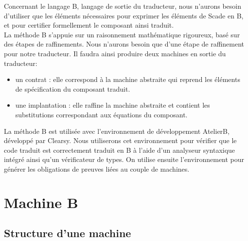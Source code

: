 

Concernant le langage B, langage de sortie du traducteur, nous
n'aurons besoin d'utiliser que les éléments nécessaires pour exprimer
les éléments de Scade en B, et pour certifier formellement le
composant ainsi traduit.\\
La méthode B s'appuie sur un raisonnement mathématique rigoureux, basé
sur des étapes de raffinements. Nous n'aurons besoin que d'une étape de
raffinement pour notre traducteur. Il faudra ainsi produire deux
machines en sortie du traducteur:
\begin{itemize}
\item un contrat : elle correspond à la machine abstraite
  qui reprend les éléments de spécification du composant traduit.
\item une implantation : elle raffine la machine abstraite et
  contient les substitutions correspondant aux équations du composant.
\end{itemize}
La méthode B est utilisée avec l'environnement de développement
AtelierB, développé par Clearsy. Nous utiliserons cet environnement
pour vérifier que le code traduit est correctement traduit en B à
l'aide d'un analyseur syntaxique intégré ainsi qu'un vérificateur de types. On
utilise ensuite l'environnement pour générer les obligations de
preuves liées au couple de machines.




\section{Machine B}

\subsection{Structure d'une machine}

